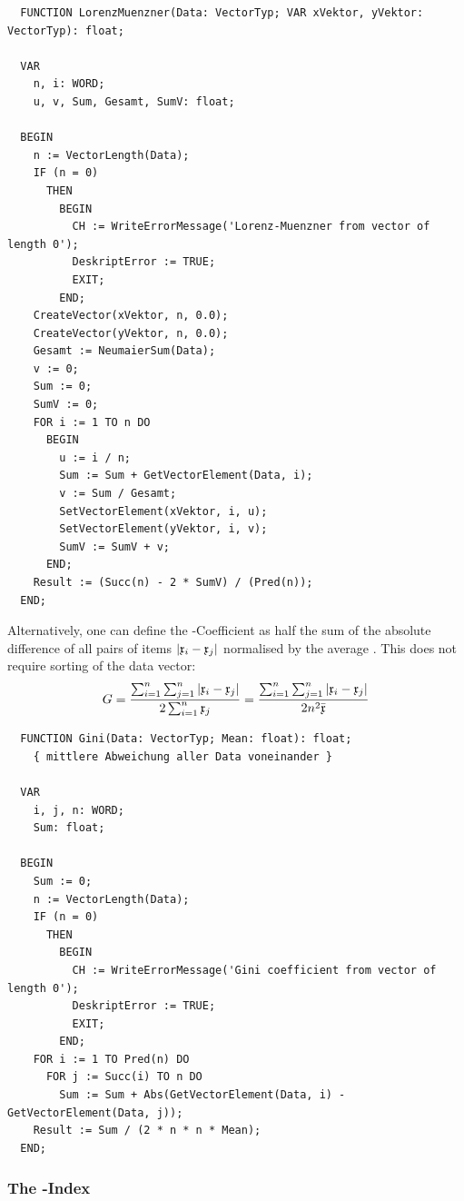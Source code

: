 \begin{refsection}
\begin{lstlisting}
  FUNCTION LorenzMuenzner(Data: VectorTyp; VAR xVektor, yVektor: VectorTyp): float;

  VAR
    n, i: WORD;
    u, v, Sum, Gesamt, SumV: float;

  BEGIN
    n := VectorLength(Data);
    IF (n = 0)
      THEN
        BEGIN
          CH := WriteErrorMessage('Lorenz-Muenzner from vector of length 0');
          DeskriptError := TRUE;
          EXIT;
        END;
    CreateVector(xVektor, n, 0.0);
    CreateVector(yVektor, n, 0.0);
    Gesamt := NeumaierSum(Data);
    v := 0;
    Sum := 0;
    SumV := 0;
    FOR i := 1 TO n DO
      BEGIN
        u := i / n;
        Sum := Sum + GetVectorElement(Data, i);
        v := Sum / Gesamt;
        SetVectorElement(xVektor, i, u);
        SetVectorElement(yVektor, i, v);
        SumV := SumV + v;
      END;
    Result := (Succ(n) - 2 * SumV) / (Pred(n));
  END;
\end{lstlisting}

Alternatively, one can define the -Coefficient as half the sum of the absolute difference of all pairs of items \( |\mathfrak{x}_i - \mathfrak{x}_j| \) normalised by the average . This does not require sorting of the data vector:
\begin{equation}
  G = \frac{\sum_{i=1}^n{\sum_{j=1}^n{|\mathfrak{x}_i - \mathfrak{x}_j|}}}{2\sum_{i=1}^n{\mathfrak{x}_j}} = \frac{\sum_{i=1}^n{\sum_{j=1}^n{|\mathfrak{x}_i - \mathfrak{x}_j|}}}{2 n^2 \bar{\mathfrak{x}}}
\end{equation}

\begin{lstlisting}
  FUNCTION Gini(Data: VectorTyp; Mean: float): float;
    { mittlere Abweichung aller Data voneinander }

  VAR
    i, j, n: WORD;
    Sum: float;

  BEGIN
    Sum := 0;
    n := VectorLength(Data);
    IF (n = 0)
      THEN
        BEGIN
          CH := WriteErrorMessage('Gini coefficient from vector of length 0');
          DeskriptError := TRUE;
          EXIT;
        END;
    FOR i := 1 TO Pred(n) DO
      FOR j := Succ(i) TO n DO
        Sum := Sum + Abs(GetVectorElement(Data, i) - GetVectorElement(Data, j));
    Result := Sum / (2 * n * n * Mean);
  END;
\end{lstlisting}

\subsubsection{The -Index}


\end{refsection}
